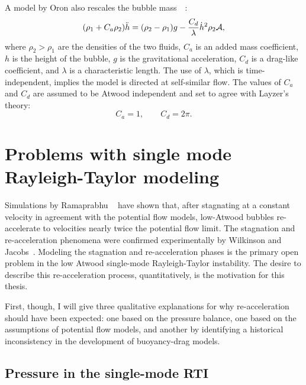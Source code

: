 A model by Oron \etal also rescales the bubble mass~~\cite{Oron2001}:
\begin{equation} \elabel{buoyancy_drag}
(\rho_1 + C_a \rho_2) \ddot{h} = (\rho_2 - \rho_1)g - \frac{C_d}{\lambda} \dot{h}^2 \rho_2 \mathcal{A},
\end{equation}
where $\rho_2 > \rho_1$ are the densities of the two fluids, 
$C_a$ is an added mass coefficient,
$h$ is the height of the bubble,
$g$ is the gravitational acceleration,
$C_d$ is a drag-like coefficient, and
$\lambda$ is a characteristic length.
The use of $\lambda$, which is time-independent, implies the model is directed at self-similar flow.
The values of $C_a$ and $C_d$ are assumed to be Atwood independent and set to agree with Layzer's theory:
\begin{equation}
C_a = 1, \qquad C_d = 2\pi.
\end{equation}

\section{Problems with single mode Rayleigh-Taylor modeling}

Simulations by Ramaprabhu \etal ~\cite{Ramaprabhu2006} have shown that, after stagnating at a constant velocity in agreement with the potential flow models, low-Atwood bubbles re-accelerate to velocities nearly twice the potential flow limit.
The stagnation and re-acceleration phenomena were confirmed experimentally by Wilkinson and Jacobs~\cite{Wilkinson2007}.
Modeling the stagnation and re-acceleration phases is the primary open problem in the low Atwood single-mode Rayleigh-Taylor instability.
The desire to describe this re-acceleration process, quantitatively, is the motivation for this thesis.

First, though, I will give three qualitative explanations for why re-acceleration should have been expected: one based on the pressure balance, one based on the assumptions of potential flow models, and another by identifying a historical inconsistency in the development of buoyancy-drag models.

\subsection{Pressure in the single-mode RTI}

